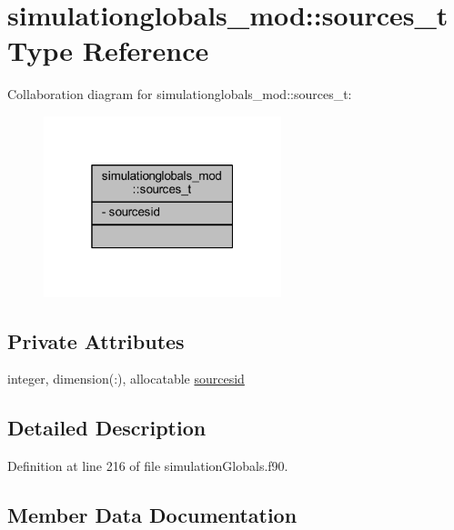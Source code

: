 \hypertarget{structsimulationglobals__mod_1_1sources__t}{}\section{simulationglobals\+\_\+mod\+:\+:sources\+\_\+t Type Reference}
\label{structsimulationglobals__mod_1_1sources__t}


Collaboration diagram for simulationglobals\+\_\+mod\+:\+:sources\+\_\+t\+:\nopagebreak
\begin{figure}[H]
\begin{center}
\leavevmode
\includegraphics[width=196pt]{structsimulationglobals__mod_1_1sources__t__coll__graph}
\end{center}
\end{figure}
\subsection*{Private Attributes}
\begin{DoxyCompactItemize}
\item 
integer, dimension(\+:), allocatable \mbox{\hyperlink{structsimulationglobals__mod_1_1sources__t_a4cca0ec7140c2ded6f2a1c4f14eafa6f}{sourcesid}}
\end{DoxyCompactItemize}


\subsection{Detailed Description}


Definition at line 216 of file simulation\+Globals.\+f90.



\subsection{Member Data Documentation}
\mbox{\label{structsimulationglobals__mod_1_1sources__t_a4cca0ec7140c2ded6f2a1c4f14eafa6f}} 
